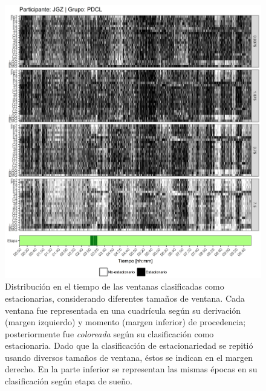 \begin{figure}
\centering
\includegraphics[width=\linewidth]
{./scripts_graf_res/JGZ_patrones_1.png}
\caption[Distribución en el tiempo de las ventanas clasificadas como estacionarias, considerando diferentes tamaños de ventana]{Distribución en el tiempo de las ventanas clasificadas como estacionarias, considerando diferentes tamaños de ventana. 
Cada ventana fue representada en una cuadrícula según su derivación (margen izquierdo) y momento (margen inferior) de procedencia; posteriormente fue \textit{coloreada} según su clasificación como estacionaria.
Dado que la clasificación de estacionariedad se repitió usando diversos tamaños de ventana, éstos se indican en el margen derecho.
En la parte inferior se representan las mismas épocas en su clasificación según etapa de sueño.}
\end{figure}
